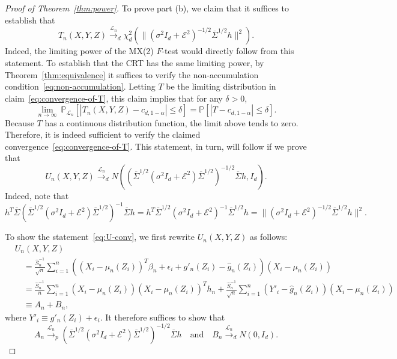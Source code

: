 \documentclass[12pt]{article}
\theoremstyle{definition}
\theoremstyle{remark}
\newcommand{\eps}{\epsilon}
\newcommand{\srx}{X}
\newcommand{\srz}{Z}
\newcommand{\sry}{Y}
\newcommand{\seps}{\epsilon}
\begin{document}
\begin{proof}[Proof of Theorem~\ref{thm:power}]
To prove part (b), we claim that it suffices to establish that
\begin{equation}
	T_n(\srx, \sry, \srz)\overset{\mathcal L_n}\rightarrow_d \chi^2_d(\|(\sigma^2I_d +\mathcal E^2)^{-1/2}\overline \Sigma^{1/2} h\|^2).
	\label{eq:convergence-of-T}
\end{equation}
Indeed, the limiting power of the MX(2) $F$-test would directly follow from this statement. To establish that the CRT has the same limiting power, by Theorem~\ref{thm:equivalence} it suffices to verify the non-accumulation condition~\eqref{eq:non-accumulation}. Letting $T$ be the limiting distribution in claim~\eqref{eq:convergence-of-T}, this claim implies that for any $\delta > 0$,
\begin{equation*}
 \lim_{n \rightarrow \infty}\ \mathbb P_{\mathcal L_n}[|T_n(\srx, \sry, \srz)-c_{d,1-\alpha}| \leq \delta] = \mathbb P[|T - c_{d,1-\alpha}| \leq \delta].
\end{equation*}
Because $T$ has a continuous distribution function, the limit above tends to zero. Therefore, it is indeed sufficient to verify the claimed convergence~\eqref{eq:convergence-of-T}. This statement, in turn, will follow if we prove that
	\begin{equation}
		U_n(\srx, \sry, \srz) \overset{\mathcal L_n}\rightarrow_d N((\overline \Sigma^{1/2}(\sigma^2I_d +\mathcal E^2)\overline \Sigma^{1/2})^{-1/2}\overline \Sigma h, I_d).
		\label{eq:U-conv}
	\end{equation}
	Indeed, note that
	\begin{equation*}
		h^T \overline \Sigma (\overline \Sigma^{1/2}(\sigma^2I_d +\mathcal E^2)\overline \Sigma^{1/2})^{-1}\overline \Sigma h = h^T \overline \Sigma^{1/2} (\sigma^2I_d +\mathcal E^2)^{-1}\overline \Sigma^{1/2} h = \|(\sigma^2I_d +\mathcal E^2)^{-1/2}\overline \Sigma^{1/2} h\|^2.
	\end{equation*}
	
	To show the statement~\eqref{eq:U-conv}, we first rewrite $U_n(\srx, \sry,\srz)$ as follows:
	\begin{equation*}
		\begin{split}
			&U_n(X,Y,Z) \\
			&\quad= \frac{\widehat S^{-1}_n}{\sqrt{n}}\sum_{i = 1}^n ((X_i - \mu_n(Z_i))^T \beta_n + \eps_i + g'_n(\srz_i) - \widehat g_n(\srz_i))(\srx_i - \mu_n(\srz_i)) \\
			&\quad= \frac{\widehat S^{-1}_n}{n}\sum_{i = 1}^n (\srx_i - \mu_n(\srz_i))(X_i - \mu_n(Z_i))^T h_n + \frac{\widehat S^{-1}_n}{\sqrt{n}}\sum_{i = 1}^n (Y'_i - \widehat g_n(Z_i))(\srx_i - \mu_n(\srz_i)) \\
			&\quad \equiv A_n + B_n,
		\end{split}
	\end{equation*}
	where $Y'_i \equiv g'_n(\srz_i) + \seps_i.$ It therefore suffices to show that
	\begin{equation}
		A_n \overset{\mathcal L_n}\rightarrow_p (\overline \Sigma^{1/2}(\sigma^2 I_d + \mathcal E^2)\overline \Sigma^{1/2})^{-1/2}\overline \Sigma h\quad \text{and} \quad B_n \overset{\mathcal L_n}\rightarrow_d N(0, I_d).
		\label{eq:sufficient}
	\end{equation}
	

\end{proof}
\end{document}
